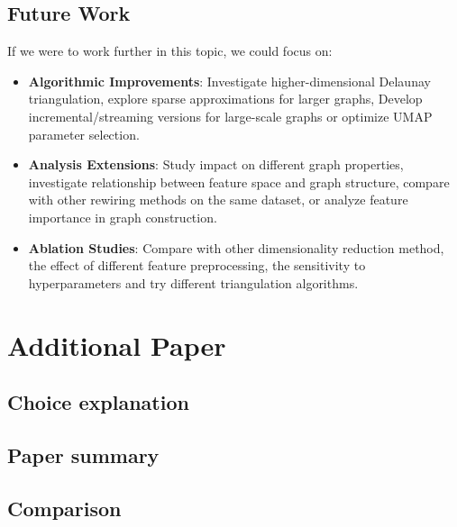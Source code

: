 \documentclass{article}
\theoremstyle{plain}
\theoremstyle{definition}
\theoremstyle{remark}
\begin{document}
\subsection{Future Work}
If we were to work further in this topic, we could focus on:
\begin{itemize}
    \item \textbf{Algorithmic Improvements}: Investigate higher-dimensional 
    Delaunay triangulation, explore sparse approximations for larger graphs, 
   Develop incremental/streaming versions for large-scale graphs or 
   optimize UMAP parameter selection.

    \item \textbf{Analysis Extensions}:
   Study impact on different graph properties, 
   investigate relationship between feature space and graph structure,
   compare with other rewiring methods on the same dataset,
   or analyze feature importance in graph construction.

    \item \textbf{Ablation Studies}:
   Compare with other dimensionality reduction method, the effect of different 
   feature preprocessing, the sensitivity to hyperparameters and try different
    triangulation algorithms.
\end{itemize}

\section{Additional Paper}

\subsection{Choice explanation}

\subsection{Paper summary}

\subsection{Comparison}
\end{document}
